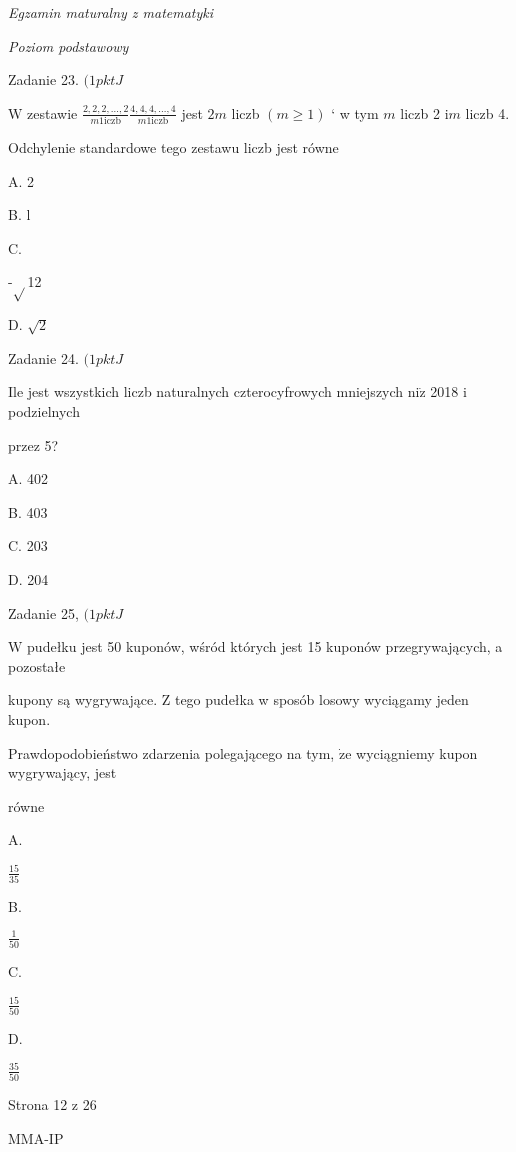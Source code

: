 \documentclass[a4paper,12pt]{article}
\begin{document}
{\it Egzamin maturalny z matematyki}

{\it Poziom podstawowy}

Zadanie 23. $(1pktJ$

$\mathrm{W}$ zestawie $\displaystyle \frac{2,2,2,\ldots,2}{m1\mathrm{i}\mathrm{c}\mathrm{z}\mathrm{b}}\frac{4,4,4,\ldots,4}{m1\mathrm{i}\mathrm{c}\mathrm{z}\mathrm{b}}$ jest $2m$ liczb $(m\geq 1)$ ` w tym $m$ liczb 2 $\mathrm{i} m$ liczb 4.

Odchylenie standardowe tego zestawu liczb jest równe

A. 2

B. l

C.

-$\sqrt{}$12

D. $\sqrt{2}$

Zadanie 24. $(1pktJ$

Ile jest wszystkich liczb naturalnych czterocyfrowych mniejszych $\mathrm{n}\mathrm{i}\dot{\mathrm{z}}$ 2018 i podzielnych

przez 5?

A. 402

B. 403

C. 203

D. 204

Zadanie 25, $(1pktJ$

$\mathrm{W}$ pudełku jest 50 kuponów, wśród których jest 15 kuponów przegrywających, a pozostałe

kupony są wygrywające. $\mathrm{Z}$ tego pudełka w sposób losowy wyciągamy jeden kupon.

Prawdopodobieństwo zdarzenia polegającego na tym, $\dot{\mathrm{z}}\mathrm{e}$ wyciągniemy kupon wygrywający, jest

równe

A.

$\displaystyle \frac{15}{35}$

B.

$\displaystyle \frac{1}{50}$

C.

$\displaystyle \frac{15}{50}$

D.

$\displaystyle \frac{35}{50}$

Strona 12 z 26

MMA-IP
\end{document}
